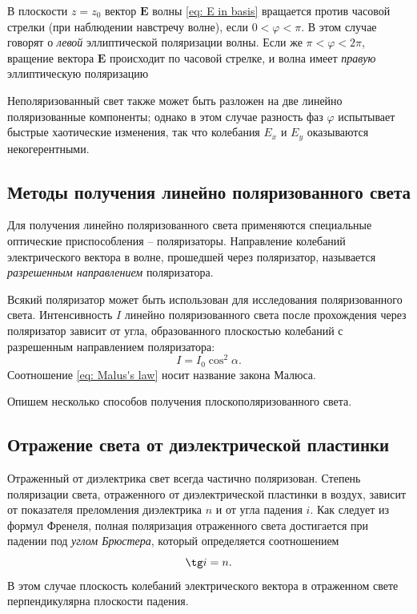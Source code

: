 \documentclass[a4paper,12pt]{article}
\begin{document}
В плоскости $z = z_0$ вектор $\mathbf{E}$ волны \eqref{eq: E in basis} вращается против часовой стрелки (при наблюдении навстречу волне), если $0 < \varphi < \pi$. В этом случае говорят о \textit{левой} эллиптической поляризации волны. Если же
$\pi < \varphi < 2\pi$, вращение вектора $\mathbf{E}$ происходит по часовой стрелке, и волна имеет \textit{правую} эллиптическую поляризацию

Неполяризованный свет также может быть разложен на две линейно поляризованные компоненты; однако в этом случае разность фаз $\varphi$ испытывает быстрые хаотические изменения, так что колебания $E_x$ и $E_y$ оказываются некогерентными.

\subsection{Методы получения линейно поляризованного света} 
Для получения линейно поляризованного света применяются специальные оптические приспособления -- поляризаторы. Направление колебаний электрического вектора в волне, прошедшей через поляризатор, называется \textit{разрешенным направлением} поляризатора.

Всякий поляризатор может быть использован для исследования поляризованного света. Интенсивность $I$ линейно поляризованного света после прохождения через поляризатор зависит от угла, образованного плоскостью колебаний с разрешенным направлением поляризатора:
\begin{equation}\label{eq: Malus's law}
    I = I_0\cos^2\alpha.
\end{equation}
Соотношение \eqref{eq: Malus's law} носит название закона Малюса.

Опишем несколько способов получения плоскополяризованного света.

\subsection{Отражение света от диэлектрической пластинки}
Отраженный от диэлектрика свет всегда частично поляризован. Степень поляризации света, отраженного от диэлектрической пластинки в воздух, зависит от показателя преломления диэлектрика $n$ и от угла падения $i$. Как следует из формул Френеля, полная поляризация отраженного света достигается при падении под \textit{углом Брюстера}, который определяется соотношением
\begin{equation}\label{eq: Brewster's angle}
    \tg i = n.
\end{equation}
В этом случае плоскость колебаний электрического вектора в отраженном свете перпендикулярна плоскости падения.
\end{document}
